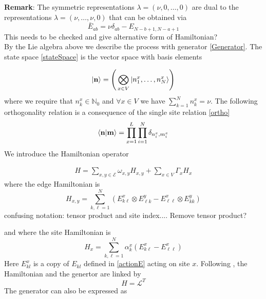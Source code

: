 \documentclass[11pt]{article}
\numberwithin{equation}{section}
\numberwithin{equation}{subsection}
\newcommand{\twoj}{\nu}
\begin{document}
\noindent
\textbf{Remark}: The symmetric representations $\lambda=(\twoj,0,\ldots,0)$ are dual to the representations $\lambda=(\twoj,\ldots,\twoj,0)$ that can be obtained via 
\begin{equation}
   \bar E_{ab}=\nu\delta_{ab}-E_{N-b+1,N-a+1}
\end{equation}
{\color{red} This needs to be checked and give alternative form of Hamiltonian?}\\
By the Lie algebra above we describe the process with generator \eqref{Generator}. The state space \eqref{stateSpace} is the vector space with basis elements 

\begin{equation}
|{\bf n}\rangle=\left(\,\bigotimes_{x\in V}	|n_{1}^{x},\ldots,n_{N}^{x}\rangle\right)
\end{equation}
where we require that $n_{k}^{x}\in \mathbb{N}_{0}$ and $\forall x\in V$ we have $\sum_{k=1}^{N}n_{k}^{x}=\nu$. The following orthogonality relation is a consequence of the single site relation \eqref{ortho}
\begin{equation}
    \langle {\bf n}|{\bf m}\rangle =\prod_{x=1}^L\prod_{i=1}^N\delta_{n^x_i,m^{x}_i}
\end{equation}
We introduce the Hamiltonian operator

\begin{equation}\label{OriginalHamiltonian}
	\begin{split}
		H=\sum_{x,y\in \mathcal{E}}\omega_{x,y}H_{x,y}+\sum_{x\in V}\Gamma_{x}H_{x}
	\end{split}
\end{equation}
where the edge Hamiltonian is
\begin{equation}\label{edgeHamiltonian}
H_{x,y}=\sum_{k,\ell=1}^{N}\left(E_{k\ell}^{x}\otimes E_{\ell k}^{y}-E_{\ell\ell}^{x}\otimes E_{kk}^{y}\right)
 \end{equation}
 {\color{red}confusing notation: tensor product and site index.... Remove tensor product?}
 
 and where the site Hamiltonian is
 \begin{equation}\label{siteHamiltonian}
H_{x}=\sum_{k,\ell=1}^{N}\alpha_{k}^{x}\left(E_{k\ell}^{x}-E_{\ell\ell}^{x}\right)
\end{equation}
Here $E_{kl}^{x}$ is a copy of $E_{kl}$ defined in \eqref{actionE} acting on site $x$. 
Following  \cite{belitsky2015self}, the Hamiltonian and the genertor are linked by
\begin{equation}
H=\mathcal{L}^{T}
\end{equation}
The generator can also be expressed as 
\end{document}
